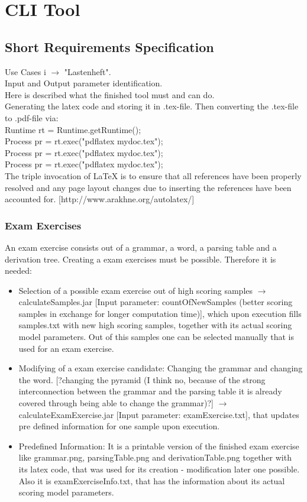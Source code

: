 
\section{CLI Tool}

\subsection{Short Requirements Specification}
Use Cases i $\longrightarrow$ "Lastenheft".\\
Input and Output parameter identification.\\
Here is described what the finished tool must and can do.\\

\noindent Generating the latex code and storing it in .tex-file. Then converting the .tex-file to .pdf-file via:\\
Runtime rt = Runtime.getRuntime();\\
Process pr = rt.exec("pdflatex mydoc.tex");\\
Process pr = rt.exec("pdflatex mydoc.tex");\\
Process pr = rt.exec("pdflatex mydoc.tex");\\
The triple invocation of LaTeX is to ensure that all references have been properly resolved and any page layout changes due to inserting the references have been accounted for. [http://www.arakhne.org/autolatex/]

\subsubsection{Exam Exercises}
An exam exercise consists out of a grammar, a word, a parsing table and a derivation tree. Creating a exam exercises must be possible. Therefore it is needed:
\begin{itemize}
	\item Selection of a possible exam exercise out of high scoring samples $\longrightarrow$ calculateSamples.jar [Input parameter: countOfNewSamples (better scoring samples in exchange for longer computation time)], which upon execution fills samples.txt with new high scoring samples, together with its actual scoring model parameters. Out of this samples one can be selected manually that is used for an exam exercise.
	\item Modifying of a exam exercise candidate: Changing the grammar and changing the word. [?changing the pyramid (I think no, because of the strong interconnection between the grammar and the parsing table it is already covered through being able to change the grammar)?] $\longrightarrow$ calculateExamExercise.jar [Input parameter: examExercise.txt], that updates pre defined information for one sample upon execution.
	\item Predefined Information: It is a printable version of the finished exam exercise like grammar.png, parsingTable.png and derivationTable.png together with its latex code, that was used for its creation - modification later one possible. Also it is examExerciseInfo.txt, that has the information about its actual scoring model parameters. 
\end{itemize}

